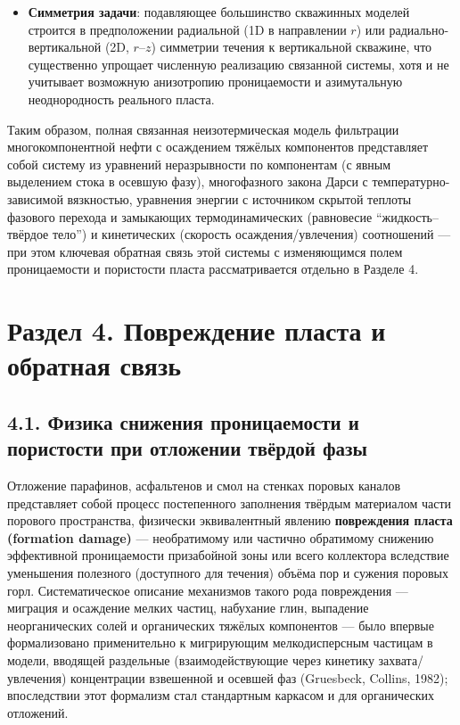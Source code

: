 \documentclass[11pt]{extarticle}
\begin{document}
\begin{itemize}
\item
  \textbf{Симметрия задачи}: подавляющее большинство скважинных моделей строится в предположении радиальной (1D в направлении \(r\)) или радиально-вертикальной (2D, \(r\)--\(z\)) симметрии течения к вертикальной скважине, что существенно упрощает численную реализацию связанной системы, хотя и не учитывает возможную анизотропию проницаемости и азимутальную неоднородность реального пласта.
\end{itemize}

Таким образом, полная связанная неизотермическая модель фильтрации многокомпонентной нефти с осаждением тяжёлых компонентов представляет собой систему из уравнений неразрывности по компонентам (с явным выделением стока в осевшую фазу), многофазного закона Дарси с температурно-зависимой вязкностью, уравнения энергии с источником скрытой теплоты фазового перехода и замыкающих термодинамических (равновесие ``жидкость--твёрдое тело'') и кинетических (скорость осаждения/увлечения) соотношений --- при этом ключевая обратная связь этой системы с изменяющимся полем проницаемости и пористости пласта рассматривается отдельно в Разделе 4.

\newpage

\section{Раздел 4. Повреждение пласта и обратная связь}\label{ux440ux430ux437ux434ux435ux43b-4.-ux43fux43eux432ux440ux435ux436ux434ux435ux43dux438ux435-ux43fux43bux430ux441ux442ux430-ux438-ux43eux431ux440ux430ux442ux43dux430ux44f-ux441ux432ux44fux437ux44c}

\subsection{4.1. Физика снижения проницаемости и пористости при отложении твёрдой фазы}\label{ux444ux438ux437ux438ux43aux430-ux441ux43dux438ux436ux435ux43dux438ux44f-ux43fux440ux43eux43dux438ux446ux430ux435ux43cux43eux441ux442ux438-ux438-ux43fux43eux440ux438ux441ux442ux43eux441ux442ux438-ux43fux440ux438-ux43eux442ux43bux43eux436ux435ux43dux438ux438-ux442ux432ux451ux440ux434ux43eux439-ux444ux430ux437ux44b}

Отложение парафинов, асфальтенов и смол на стенках поровых каналов представляет собой процесс постепенного заполнения твёрдым материалом части порового пространства, физически эквивалентный явлению \textbf{повреждения пласта (formation damage)} --- необратимому или частично обратимому снижению эффективной проницаемости призабойной зоны или всего коллектора вследствие уменьшения полезного (доступного для течения) объёма пор и сужения поровых горл. Систематическое описание механизмов такого рода повреждения --- миграция и осаждение мелких частиц, набухание глин, выпадение неорганических солей и органических тяжёлых компонентов --- было впервые формализовано применительно к мигрирующим мелкодисперсным частицам в модели, вводящей раздельные (взаимодействующие через кинетику захвата/увлечения) концентрации взвешенной и осевшей фаз (Gruesbeck, Collins, 1982); впоследствии этот формализм стал стандартным каркасом и для органических отложений.
\end{document}
